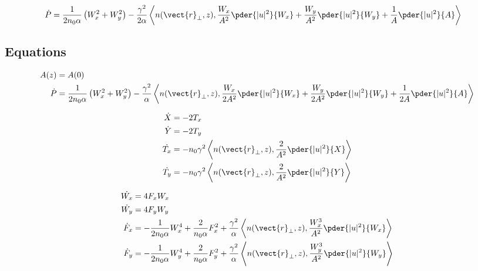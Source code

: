 \begin{equation}
\begin{split}
    \dot{P}  &= \frac{1}{2 n_0 \alpha} \left(W_{x}^2 + W_{y}^2\right)  - \frac{\gamma^2 }{ 2 \alpha }\left<n(\vect{r}_{\perp},z), \frac{W_{x}}{A^2} \pder{|u|^2}{W_{x}}+ \frac{ W_{y}}{A^2}\pder{|u|^2}{W_{y}}+\frac{1}{A}\pder{|u|^2}{A}\right> 
\end{split}
\end{equation}



\pagebreak
\subsection{Equations}
\begin{equation}
\begin{split}
  A(z) &= A(0)\\
\dot{P}  &= \frac{1}{2 n_0 \alpha} \left(W_{x}^2 + W_{y}^2\right)  - \frac{\gamma^2 }{\alpha } \left<n(\vect{r}_{\perp},z), \frac{W_{x}}{2A^2} \pder{|u|^2}{W_{x}}+ \frac{ W_{y}}{2A^2}\pder{|u|^2}{W_{y}}+\frac{1}{2A}\pder{|u|^2}{A}\right> \\
\end{split}
\end{equation}

\begin{equation}
\begin{split}
 \dot{X} &= - 2T_x \\
\dot{Y} &= - 2T_y \\
\dot{T_x} &= - n_0 \gamma^2 \left<n(\vect{r}_{\perp},z), \frac{2}{A^2}\pder{|u|^2}{X}\right> \\
\dot{T_y} &= - n_0 \gamma^2 \left<n(\vect{r}_{\perp},z), \frac{2}{A^2} \pder{|u|^2}{Y}\right> \\
\end{split}
\end{equation}


\begin{equation}
\begin{split}
\dot{W_{x}} &= 4 F_{x}W_{x} \\
\dot{W_{y}} &= 4 F_{y}W_{y} \\
\dot{F}_{x}  &=   - \frac{1}{2 n_0 \alpha} W_{x}^4+ \frac{2}{n_0 \alpha} F_{x}^2  
+ \frac{\gamma^2}{\alpha}  \left<n(\vect{r}_{\perp},z), \frac{W_{x}^3}{A^2} \pder{|u|^2}{W_{x}}\right> \\    
\dot{F}_{y}  &=   - \frac{1}{2 n_0 \alpha} W_{y}^4 + \frac{2}{n_0 \alpha} F_{y}^2  + \frac{\gamma^2}{\alpha}  \left<n(\vect{r}_{\perp},z), \frac{W_{y}^3}{A^2} \pder{|u|^2}{W_{y}}\right>\\
\end{split}
\end{equation}



